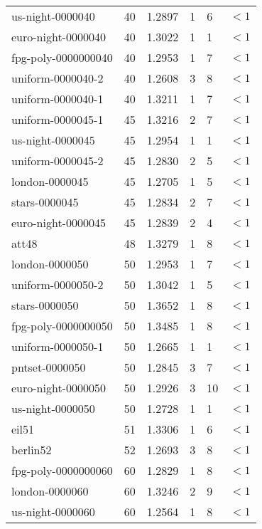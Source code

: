 \begin{longtable}{|lrrlll|}
us-night-0000040 & 40 & \num{1.2897} & \num{1} & \num{6} & $<1$ \\
euro-night-0000040 & 40 & \num{1.3022} & \num{1} & \num{1} & $<1$ \\
fpg-poly-0000000040 & 40 & \num{1.2953} & \num{1} & \num{7} & $<1$ \\
uniform-0000040-2 & 40 & \num{1.2608} & \num{3} & \num{8} & $<1$ \\
uniform-0000040-1 & 40 & \num{1.3211} & \num{1} & \num{7} & $<1$ \\
uniform-0000045-1 & 45 & \num{1.3216} & \num{2} & \num{7} & $<1$ \\
us-night-0000045 & 45 & \num{1.2954} & \num{1} & \num{1} & $<1$ \\
uniform-0000045-2 & 45 & \num{1.2830} & \num{2} & \num{5} & $<1$ \\
london-0000045 & 45 & \num{1.2705} & \num{1} & \num{5} & $<1$ \\
stars-0000045 & 45 & \num{1.2834} & \num{2} & \num{7} & $<1$ \\
euro-night-0000045 & 45 & \num{1.2839} & \num{2} & \num{4} & $<1$ \\
att48 & 48 & \num{1.3279} & \num{1} & \num{8} & $<1$ \\
london-0000050 & 50 & \num{1.2953} & \num{1} & \num{7} & $<1$ \\
uniform-0000050-2 & 50 & \num{1.3042} & \num{1} & \num{5} & $<1$ \\
stars-0000050 & 50 & \num{1.3652} & \num{1} & \num{8} & $<1$ \\
fpg-poly-0000000050 & 50 & \num{1.3485} & \num{1} & \num{8} & $<1$ \\
uniform-0000050-1 & 50 & \num{1.2665} & \num{1} & \num{1} & $<1$ \\
pntset-0000050 & 50 & \num{1.2845} & \num{3} & \num{7} & $<1$ \\
euro-night-0000050 & 50 & \num{1.2926} & \num{3} & \num{10} & $<1$ \\
us-night-0000050 & 50 & \num{1.2728} & \num{1} & \num{1} & $<1$ \\
eil51 & 51 & \num{1.3306} & \num{1} & \num{6} & $<1$ \\
berlin52 & 52 & \num{1.2693} & \num{3} & \num{8} & $<1$ \\
fpg-poly-0000000060 & 60 & \num{1.2829} & \num{1} & \num{8} & $<1$ \\
london-0000060 & 60 & \num{1.3246} & \num{2} & \num{9} & $<1$ \\
us-night-0000060 & 60 & \num{1.2564} & \num{1} & \num{8} & $<1$ \\

\end{longtable}
